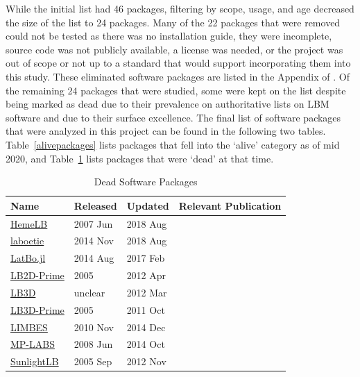 \documentclass[final, 3p, times, authoryear]{elsarticle}
\begin{document}
While the initial list had 46 packages, filtering by scope, usage, and age
decreased the size of the list to 24 packages. Many of the 22 packages that were
removed could not be tested as there was no installation guide, they were
incomplete, source code was not publicly available, a license was needed, or the
project was out of scope or not up to a standard that would support
incorporating them into this study. These eliminated software packages are
listed in the Appendix of \citet{Michalski2021}. Of the remaining 24 packages
that were studied, some were kept on the list despite being marked as dead due
to their prevalence on authoritative lists on LBM software and due to their
surface excellence.  The final list of software packages that were analyzed in
this project can be found in the following two tables. Table~\ref{alivepackages}
lists packages that fell into the `alive' category as of mid 2020, and
Table~\ref{deadpackages} lists packages that were `dead' at that time.

\begin{table}
	\begin{center}
		\begin{tabular}{ p{3cm}p{2cm}p{2cm}p{5.5cm} }
			\toprule
			Name & Released & Updated & Relevant Publication\\
			\midrule
			\href{https://github.com/UCL/hemelb}{HemeLB} & 2007 Jun & 2018 Aug&\citep{mazzeo2008hemelb}\\
			\href{https://github.com/maxlevesque/laboetie}{laboetie} & 2014 Nov & 2018 Aug&\citep{levesque2013accounting}\\		
			\href{https://github.com/UCL/LatBo.jl}{LatBo.jl} & 2014 Aug & 2017 Feb&\\
			\href{https://code.google.com/p/lb2d-prime-dev/source}{LB2D-Prime} & 2005 & 2012 Apr&\\
			\href{http://ccs.chem.ucl.ac.uk/sites/ccs.chem.ucl.ac.uk/themes/ccs2/files/lb3d-2012-03-12.tgz}{LB3D} & unclear & 2012 Mar&\citep{schmieschek2017lb3d}\\
			\href{https://code.google.com/archive/p/lb3d-prime-dev/source}{LB3D-Prime} & 2005 & 2011 Oct&\\
			\href{https://code.google.com/archive/p/limbes/source}{LIMBES} & 2010 Nov & 2014 Dec&\\
			\href{https://github.com/carlosrosales/mplabs}{MP-LABS} & 2008 Jun & 2014 Oct&\\
			\href{https://sourceforge.net/projects/sunlightlb/files/latest/download}{SunlightLB} & 2005 Sep & 2012 Nov&\\
			\bottomrule
		\end{tabular}
		\caption{Dead Software Packages} \label{deadpackages}
	\end{center}
\end{table}
\end{document}
